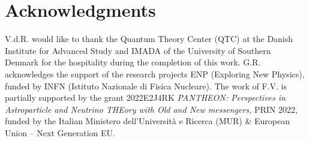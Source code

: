 \documentclass[a4paper,11pt]{article}
\begin{document}
\section{Acknowledgments}
  V.d.R. would like to thank the Quantum Theory Center (QTC) at the Danish
Institute for Advanced Study and IMADA of the University of Southern Denmark for the hospitality during the
completion of this work. G.R. acknowledges the support of the research projects  ENP (Exploring New Physics), funded by INFN (Istituto Nazionale
di Fisica Nucleare).
The work of F.V. is partially supported by the grant 2022E2J4RK {\em PANTHEON: Perspectives in Astroparticle and Neutrino THEory with Old and New messengers,}
PRIN 2022, funded by the Italian Ministero dell’Universit\`a e Ricerca (MUR) \& European Union – Next Generation EU.
\newpage

\end{document}
